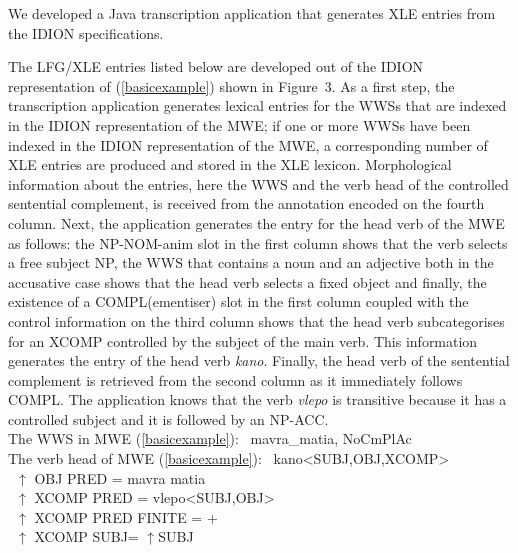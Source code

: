 \documentclass[output=paper,
modfonts
]{langscibook}
\begin{document}
We developed a Java transcription application that generates XLE entries from the IDION specifications. 

The LFG/XLE entries listed below are developed out of the IDION representation of (\ref{basicexample}) shown in Figure~3. As a first step, the transcription application generates lexical entries for the WWSs that are indexed in the IDION representation of the MWE;  if one or more WWSs have been indexed in the IDION representation of the MWE, a corresponding number of XLE entries are produced and stored in the XLE lexicon. Morphological information about the entries, here the WWS and the verb head of the controlled sentential complement, is received from the annotation encoded on the fourth column. Next, the application generates the entry for the head verb of the MWE as follows: the NP-NOM-anim slot in the first column shows that the verb selects a free subject NP, the WWS that contains a noun and an adjective both in the accusative case shows that the head verb selects a fixed object and finally,  the existence of a COMPL(ementiser) slot in the first column coupled with the control information on the third column shows that the head verb subcategorises for an XCOMP controlled by the subject of the main verb.  This information generates the entry of the head verb \textit{kano}.  Finally, the head verb of the sentential complement is retrieved from the second column as it immediately follows COMPL. The application knows that the verb \textit{vlepo} is transitive because it has a controlled subject and it is followed by an NP-ACC. \\


\noindent
The WWS in MWE (\ref{basicexample}): %
~\hspace*{1em}mavra\_matia, NoCmPlAc \\

\noindent
The verb head of MWE (\ref{basicexample}): %
~\hspace*{1em}kano<SUBJ,OBJ,XCOMP>\\
~\hspace*{15em}$\uparrow$ OBJ PRED = mavra matia\\
~\hspace*{15em}$\uparrow$ XCOMP PRED = vlepo<SUBJ,OBJ>\\
~\hspace*{15em}$\uparrow$ XCOMP PRED FINITE = +\\
~\hspace*{15em}$\uparrow$ XCOMP SUBJ= $\uparrow$SUBJ\\
\end{document}
